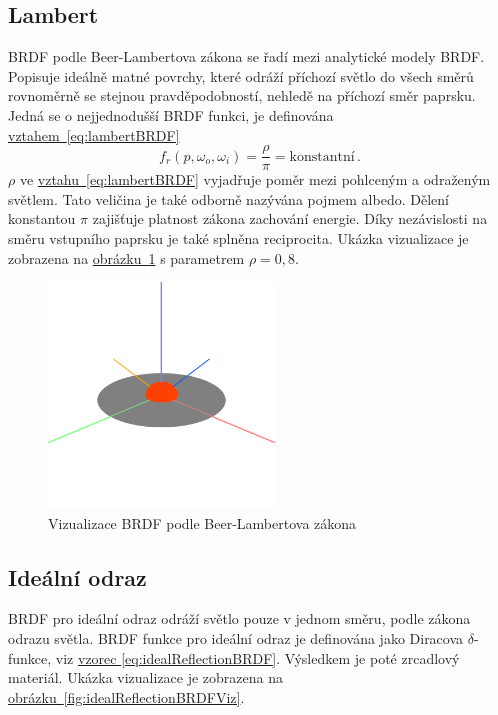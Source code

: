 \documentclass[czech,master]{diploma}
\newcommand{\point}{p}
\newcommand{\brdf}{f_r\left(\point,\omega_{o},\omega_{i}\right)}
\newcommand{\alb}{\rho}
\begin{document}
\subsection{Lambert} \label{sec:Lambert}
BRDF podle Beer-Lambertova zákona se řadí mezi analytické modely BRDF\@. Popisuje ideálně matné povrchy, které odráží příchozí světlo do všech směrů rovnoměrně se stejnou pravděpodobností, nehledě na příchozí směr paprsku. Jedná se o nejjednodušší BRDF funkci, je definována \hyperref[eq:lambertBRDF]{vztahem~\ref{eq:lambertBRDF}}~\cite{Koppal2014}
\begin{equation} \label{eq:lambertBRDF}
  \brdf = \frac{\alb}{\pi} = \text{konstantní}\,.
\end{equation}
\(\alb\) ve \hyperref[eq:lambertBRDF]{vztahu~\ref{eq:lambertBRDF}} vyjadřuje poměr mezi pohlceným a odraženým světlem. Tato veličina je také odborně nazývána pojmem albedo. Dělení konstantou \(\pi\) zajišťuje platnost zákona zachování energie. Díky nezávislosti na směru vstupního paprsku je také splněna reciprocita. Ukázka vizualizace je zobrazena na \hyperref[fig:lambertBRDFRender]{obrázku~\ref{fig:lambertBRDFRender}} s parametrem \(\alb = 0{,}8\).

\begin{figure}[ht]%
  \centering
  \includegraphics[width=6cm]{Figures/visualizations/brdfLambert.png}%
  \caption{Vizualizace BRDF podle Beer-Lambertova zákona}%
  \label{fig:lambertBRDFRender}%
\end{figure}

\subsection{Ideální odraz} \label{sec:idealReflection}
BRDF pro ideální odraz odráží světlo pouze v jednom směru, podle zákona odrazu světla. BRDF funkce pro ideální odraz je definována jako Diracova \(\delta\)-funkce, viz \hyperref[eq:idealReflectionBRDF]{vzorec \ref{eq:idealReflectionBRDF}}. Výsledkem je poté zrcadlový materiál. Ukázka vizualizace je zobrazena na \hyperref[fig:idealReflectionBRDFViz]{obrázku~\ref{fig:idealReflectionBRDFViz}}.
\end{document}
